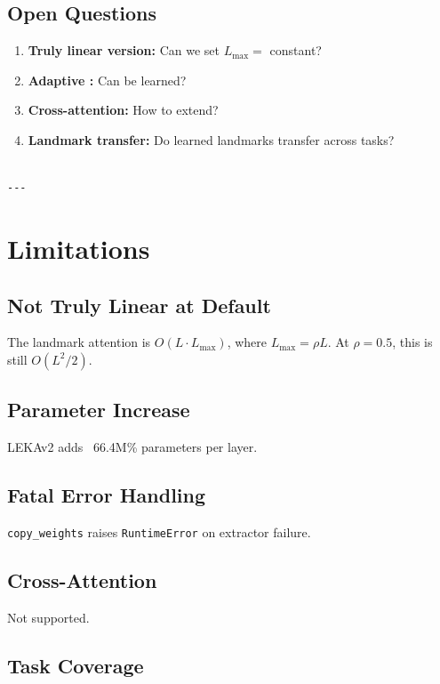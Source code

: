\subsection{Open Questions}

\begin{enumerate}
\item \textbf{Truly linear version:} Can we set $L_\text{max} = $ constant?
\item \textbf{Adaptive  :} Can   be learned?
\item \textbf{Cross-attention:} How to extend?
\item \textbf{Landmark transfer:} Do learned landmarks transfer across tasks?
\end{enumerate}
\begin{lstlisting}

---
\end{lstlisting}

\section{Limitations}

\subsection{Not Truly Linear at Default}

The landmark attention is $O(L \cdot L_\text{max})$, where $L_\text{max} = \rho L$. 
At $\rho = 0.5$, this is still $O(L^2/2)$.

\subsection{Parameter Increase}

LEKAv2 adds ~66.4M\% parameters per layer.

\subsection{Fatal Error Handling}

\texttt{copy\_weights} raises \texttt{RuntimeError} on extractor failure.

\subsection{Cross-Attention}

Not supported.

\subsection{Task Coverage}

